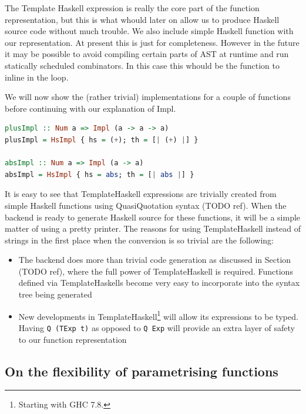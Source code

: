 \documentclass[preamble.tex]{subfiles}
\begin{document}
The Template Haskell expression is really the core part of the function representation, but this is what whould later on allow us to produce Haskell source code without much trouble. We also include simple Haskell function with our representation. At present this is just for completeness. However in the future it may be possible to avoid compiling certain parts of AST at runtime and run statically scheduled combinators. In this case this whould be the function to inline in the loop.

We will now show the (rather trivial) implementations for a couple of functions before continuing with our explanation of Impl.

\begin{lstlisting}[basicstyle={\ttfamily},language=Haskell]
plusImpl :: Num a => Impl (a -> a -> a)
plusImpl = HsImpl { hs = (+); th = [| (+) |] } 

absImpl :: Num a => Impl (a -> a)
absImpl = HsImpl { hs = abs; th = [| abs |] } 
\end{lstlisting}

It is easy to see that TemplateHaskell expressions are trivially created from simple Haskell functions using QuasiQuotation syntax (TODO ref). When the backend is ready to generate Haskell source for these functions, it will be a simple matter of using a pretty printer. The reasons for using TemplateHaskell instead of strings in the first place when the conversion is so trivial are the following:
\begin{itemize}
\item The backend does more than trivial code generation as discussed in Section (TODO ref), where the full power of TemplateHaskell is required. Functions defined via TemplateHaskells become very easy to incorporate into the syntax tree being generated
\item New developments in TemplateHaskell\footnote{Starting with GHC 7.8.} will allow its expressions to be typed. Having \texttt{Q (TExp t)} as opposed to \texttt{Q Exp} will provide an extra layer of safety to our function representation
\end{itemize}


\subsection{On the flexibility of parametrising functions}
\end{document}
